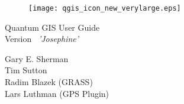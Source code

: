 \begin{titlepage}
\begin{center}

\begin{figure}[H]
\begin{center}
\texttt{[image: qgis\_icon\_new\_verylarge.eps]} 
\end{center}
\end{figure}

\Large{Quantum GIS User Guide\\ Version ~\CURRENT \textsl{'Josephine'}}

\vspace{3cm}

\large{Gary E. Sherman \\ Tim Sutton \\ Radim Blazek (GRASS) \\ 
Lars Luthman (GPS Plugin) \\ \date{\mydate\today}}

\end{center}
\end{titlepage}
